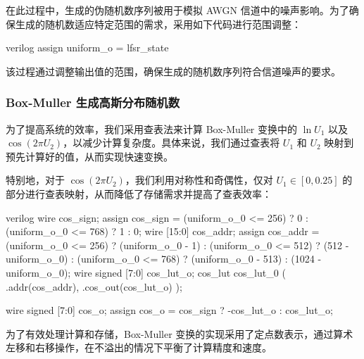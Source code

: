 在此过程中，生成的伪随机数序列被用于模拟 AWGN 信道中的噪声影响。为了确保生成的随机数适应特定范围的需求，采用如下代码进行范围调整：

\begin{codeblock}{verilog}
assign uniform_o = lfsr_state %
\end{codeblock}

该过程通过调整输出值的范围，确保生成的随机数序列符合信道噪声的要求。


\subsubsection{Box-Muller 生成高斯分布随机数}

为了提高系统的效率，我们采用查表法来计算 Box-Muller 变换中的 $\ln U_1$ 以及 $\cos(2 \pi U_2)$，以减少计算复杂度。具体来说，我们通过查表将 $U_1$ 和 $U_2$ 映射到预先计算好的值，从而实现快速变换。

特别地，对于 $\cos(2 \pi U_2)$，我们利用对称性和奇偶性，仅对 $U_1 \in [0, 0.25]$ 的部分进行查表映射，从而降低了存储需求并提高了查表效率：

\begin{codeblock}{verilog}
    wire cos_sign;
    assign cos_sign = (uniform_o_0 <= 256) ? 0 :
                      (uniform_o_0 <= 768) ? 1 :
                      0;
    wire [15:0] cos_addr;
    assign cos_addr = (uniform_o_0 <= 256) ? (uniform_o_0 - 1) :
                      (uniform_o_0 <= 512) ? (512 - uniform_o_0) :
                      (uniform_o_0 <= 768) ? (uniform_o_0 - 513) :
                      (1024 - uniform_o_0);
    wire signed [7:0] cos_lut_o;
    cos_lut cos_lut_0 (
        .addr(cos_addr),
        .cos_out(cos_lut_o)
    );

    wire signed [7:0] cos_o;
    assign cos_o = cos_sign ? -cos_lut_o : cos_lut_o;
\end{codeblock}

为了有效处理计算和存储，Box-Muller 变换的实现采用了定点数表示，通过算术左移和右移操作，在不溢出的情况下平衡了计算精度和速度。